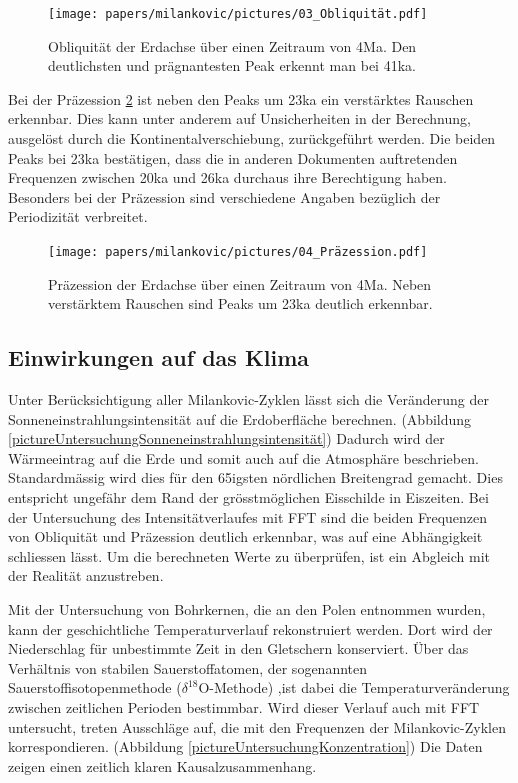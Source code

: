 \begin{figure}
	\centering
	\texttt{[image: papers/milankovic/pictures/03\_Obliquität.pdf]}
	\caption{Obliquität der Erdachse  über einen Zeitraum von 4Ma. 
	Den deutlichsten und prägnantesten Peak erkennt man bei 41ka.  
	\label{pictureUntersuchungObliquität}}
\end{figure}

Bei der Präzession
\ref{pictureUntersuchungPräzession}
ist neben den Peaks um 23ka ein verstärktes Rauschen erkennbar.
Dies kann unter anderem auf Unsicherheiten in der Berechnung, ausgelöst durch die Kontinentalverschiebung, zurückgeführt werden.
Die beiden Peaks bei 23ka bestätigen, dass die in anderen Dokumenten auftretenden Frequenzen zwischen 20ka und 26ka durchaus ihre Berechtigung haben.
Besonders bei der Präzession sind verschiedene Angaben bezüglich der Periodizität verbreitet.


\begin{figure}
	\centering
	\texttt{[image: papers/milankovic/pictures/04\_Präzession.pdf]}
	\caption{Präzession der Erdachse über einen Zeitraum von 4Ma.
	Neben verstärktem Rauschen sind Peaks um 23ka deutlich erkennbar.
		\label{pictureUntersuchungPräzession}}
\end{figure}

\subsection{Einwirkungen auf das Klima
\label{milankovic:subsection:EinwirkungenKlima}}
Unter Berücksichtigung aller Milankovic-Zyklen lässt sich die Veränderung der Sonneneinstrahlungsintensität auf die Erdoberfläche berechnen.
(Abbildung \ref{pictureUntersuchungSonneneinstrahlungsintensität})
Dadurch wird der Wärmeeintrag auf die Erde und somit auch auf die Atmosphäre beschrieben. Standardmässig wird dies für den 65igsten nördlichen Breitengrad gemacht.
Dies entspricht ungefähr dem Rand der grösstmöglichen Eisschilde in Eiszeiten.
Bei der Untersuchung des Intensitätverlaufes mit FFT sind die beiden Frequenzen von Obliquität und Präzession deutlich erkennbar, was auf eine Abhängigkeit schliessen lässt.
Um die berechneten Werte zu überprüfen, ist ein Abgleich mit der Realität anzustreben.

Mit der Untersuchung von Bohrkernen, die an den Polen entnommen wurden, kann der geschichtliche Temperaturverlauf rekonstruiert werden.
Dort wird der Niederschlag für unbestimmte Zeit in den Gletschern konserviert. Über das Verhältnis von stabilen Sauerstoffatomen, der sogenannten Sauerstoffisotopenmethode ($\delta^{18}\text{O}$-Methode)
,ist dabei die Temperaturveränderung zwischen zeitlichen Perioden bestimmbar.
Wird dieser Verlauf auch mit FFT untersucht, treten Ausschläge auf, die mit den Frequenzen der Milankovic-Zyklen korrespondieren.
(Abbildung \ref{pictureUntersuchungKonzentration})
Die Daten zeigen einen zeitlich klaren Kausalzusammenhang.

